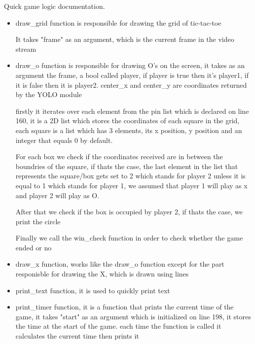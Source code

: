 \documentclass{article}
\begin{document}
\begin{Large}

Quick game logic documentation.

\end{Large}

\begin{itemize}

\item draw_grid function is responsible for drawing the grid of tic-tac-toe

It takes "frame" as an argument, which is the current frame in the video stream

\item draw_o function is responsible for drawing O's on the screen, it takes as an argument the frame, a bool called player, if player is true then it's player1, if it is false then it is player2. center_x and center_y are coordinates returned by the YOLO module

firstly it iterates over each element from the pin list which is declared on line 160, it is a 2D list which stores the coordinates of each square in the grid, each square is a list which has 3 elements, its x position, y position and an integer that equals 0 by default.

For each box we check if the coordinates received are in between the boundries of the square, if thats the case, the last element in the list that represents the square/box gets set to 2 which stands for player 2 unless it is equal to 1 which stands for player 1, we assumed that player 1 will play as x and player 2 will play as O.

After that we check if the box is occupied by player 2, if thats the case, we print the circle

Finally we call the win_check function in order to check whether the game ended or no

\item draw_x function, works like the draw_o function except for the part responisble for drawing the X, which is drawn using lines

\item print_text function, it is used to quickly print text

\item print_timer function, it is a function that prints the current time of the game, it takes "start" as an argument which is initialized on line 198, it stores the time at the start of the game. each time the function is called it calculates the current time then prints it


\end{itemize}
\end{document}
